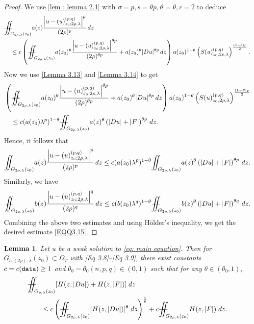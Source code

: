 \documentclass[11pt,oneside, english,reqno,twoside a4paper]{amsart}
\newtheorem{lemma}{Lemma}[section]
\theoremstyle{definition}
\numberwithin{theorem}{section}
\numberwithin{equation}{section}
\newcommand{\iintss}{{\int\hspace{-0.28cm}\int}}
\newcommand{ \miints }{{\iintss\hspace{-0.56cm} -\hspace{-0.15cm}-}}
\newcommand{\miint}[1]{{\miints_{\hspace{-0.13cm}#1}}}
\begin{document}
\begin{proof}
 We use \cref{lem : lemma 2.1} with $\sigma=p, s=\theta p, \vartheta= \theta, r=2$ to deduce
 \begin{align*}
    &\miint{G_{2\rho, \lambda}(z_0)}a(z)\frac{\left|u-(u)^{(p,q)}_{z_0 ; 2 \rho,\lambda}\right|^p}{(2 \rho)^p}\, dz\\
     &\quad \leq c\left(\miint{G_{2\rho, \lambda}(z_0)}a(z_0)^{\theta}\frac{\left|u-(u)^{(p,q)}_{z_0 ; 2 \rho,\lambda}\right|^{\theta p}}{(2 \rho)^{\theta p}}+a(z_0)^{\theta }|Du|^{\theta p}\, dz\right)a(z_0)^{1-\theta}\left(S(u)^{(p,q)}_{z_0, 2\rho, \lambda}\right)^{\frac{(1-\theta)p}{2}}.
 \end{align*}
 Now we use \cref{Lemma 3.13} and \cref{Lemma 3.14} to get
 \begin{align*}
&\left(\miint{G_{2\rho, \lambda}(z_0)}a(z_0)^{\theta}\frac{\left|u-(u)^{(p,q)}_{z_0 ; 2 \rho,\lambda}\right|^{\theta p}}{(2 \rho)^{\theta p}}+a(z_0)^{\theta }|Du|^{\theta p}\, dz\right)a(z_0)^{1-\theta}\left(S(u)^{(p,q)}_{z_0, 2\rho, \lambda}\right)^{\frac{(1-\theta)p}{2}}\\
&\quad \leq c (a(z_0)\lambda^p)^{1-\theta}\miint{G_{2\rho, \lambda}(z_0)}a(z)^{\theta}\left(|Du|+|F|\right)^{\theta p}\, dz.
 \end{align*}
 Hence, it follows that
 \begin{align*}
 \miint{G_{2\rho, \lambda}(z_0)}a(z)\frac{\left|u-(u)^{(p,q)}_{z_0 ; 2 \rho,\lambda}\right|^p}{(2 \rho)^p}\, dz\leq c (a(z_0)\lambda^p)^{1-\theta}\miint{G_{2\rho, \lambda}(z_0)}a(z)^{\theta}\left(|Du|+|F|\right)^{\theta p}\, dz.    
 \end{align*}
 Similarly, we have
 \begin{align*}
 \miint{G_{2\rho, \lambda}(z_0)}b(z)\frac{\left|u-(u)^{(p,q)}_{z_0 ; 2 \rho,\lambda}\right|^q}{(2 \rho)^q}\, dz\leq c (b(z_0)\lambda^q)^{1-\theta}\miint{G_{2\rho, \lambda}(z_0)}b(z)^{\theta}\left(|Du|+|F|\right)^{\theta q}\, dz.        
 \end{align*}
 Combining the above two estimates and using H\"{o}lder's inequality, we get the desired estimate \eqref{EQQ3.15}.
\end{proof}
\begin{lemma}
    Let $u$ be a weak solution to \eqref{eq: main equation}. Then for $G_{c_v(2 \rho),\lambda}\left(z_0\right) \subset \Omega_T$ with \eqref{Eq 3.8}--\eqref{Eq 3.9}, there exist constants $c=c(\textnormal{\texttt{data}}) \geq 1$ and $\theta_0=\theta_0(n,p,q) \in (0,1)$ such that for any $\theta\in (\theta_0,1),$
    \begin{align*}
        &\miint{G_{\rho,\lambda}(z_0)} [H(z,|Du|)+H(z, |F|)]\; dz\\
        &\qquad \leq c \left(\miint{G_{2\rho,\lambda}(z_0)} [H(z,|Du|)]^\theta\;dz\right)^\frac{1}{\theta}+c\miint{G_{2\rho,\lambda}(z_0)} H(z,|F|)\; dz.
    \end{align*}
\end{lemma}
\end{document}
